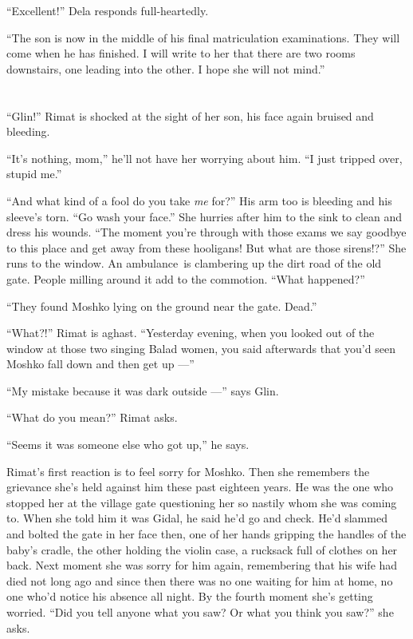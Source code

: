 \documentclass[twoside,11pt,openany]{book}
\begin{document}
``Excellent!'' Dela responds full-heartedly.

{}``The son is now in the middle of his final matriculation examinations. They will come when he has finished. I will
write to her that there are two rooms downstairs, one leading into the other. I hope she will not mind.''


\bigskip

\chapter{}

``Glin!'' Rimat is shocked at the sight of her son, his face again bruised and bleeding.

``It's nothing, mom,'' he'll not have her worrying about him. ``I just tripped over, stupid
me.''

``And what kind of a fool do you take \textit{me} for?'' His arm too is bleeding and his
sleeve's torn. ``Go wash your face.'' She hurries after him to the sink to clean and dress
his wounds. ``The moment you're through with those exams we say goodbye to this place and get away from
these hooligans! But what are those sirens!?'' She runs to the window. An ambulance~is clambering up the
dirt road of the old gate. People milling around it add to the commotion. ``What happened?''

``They found Moshko lying on the ground near the gate. Dead.''

``What?!'' Rimat is aghast. ``Yesterday evening, when you
looked out of the window at those two singing Balad women, you said afterwards that you'd seen Moshko fall down and
then get up ---''

``My mistake because it was dark outside ---'' says Glin.

``What do you mean?'' Rimat asks.

``Seems it was someone else who got up,'' he says.

Rimat's first reaction is to feel sorry for Moshko. Then she remembers the grievance she's held against him these
past{ }eighteen years. He was the one who stopped her at the village gate questioning her so nastily
whom she was coming to. When she told him it was Gidal, he said he'd go and check. He'd slammed and bolted the gate in
her face then, one of her hands gripping the handles of the baby's cradle, the other holding the violin case, a
rucksack full of clothes on her back. Next moment she was sorry for him again, remembering that  his wife had died not
long ago and since then there was no one waiting for him at home, no one who'd notice his absence all night. By the
fourth moment she's getting worried. ``Did you tell anyone what you saw? Or what you think you
saw?''  she asks.
\end{document}
